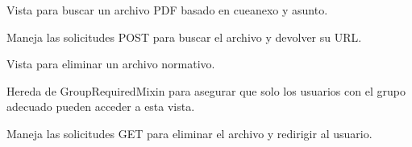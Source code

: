 \documentclass[letterpaper,10pt,spanish]{sphinxmanual}
\begin{document}
\begin{fulllineitems}

\pysigstartsignatures
{}
\pysigstopsignatures
\sphinxAtStartPar
Vista para buscar un archivo PDF basado en cueanexo y asunto.


\begin{fulllineitems}

\pysigstartsignatures
{}
\pysigstopsignatures
\sphinxAtStartPar
Maneja las solicitudes POST para buscar el archivo y devolver su URL.

\end{fulllineitems}



\begin{fulllineitems}

\pysigstartsignatures
{}
\pysigstopsignatures
\end{fulllineitems}


\end{fulllineitems}



\begin{fulllineitems}

\pysigstartsignatures
{}
\pysigstopsignatures
\sphinxAtStartPar
Vista para eliminar un archivo normativo.

\sphinxAtStartPar
Hereda de GroupRequiredMixin para asegurar que solo los usuarios
con el grupo adecuado pueden acceder a esta vista.


\begin{fulllineitems}

\pysigstartsignatures
{}
\pysigstopsignatures
\sphinxAtStartPar
Maneja las solicitudes GET para eliminar el archivo y redirigir al usuario.

\end{fulllineitems}



\begin{fulllineitems}

\pysigstartsignatures
{}
\pysigstopsignatures
\end{fulllineitems}


\end{fulllineitems}
\end{document}
